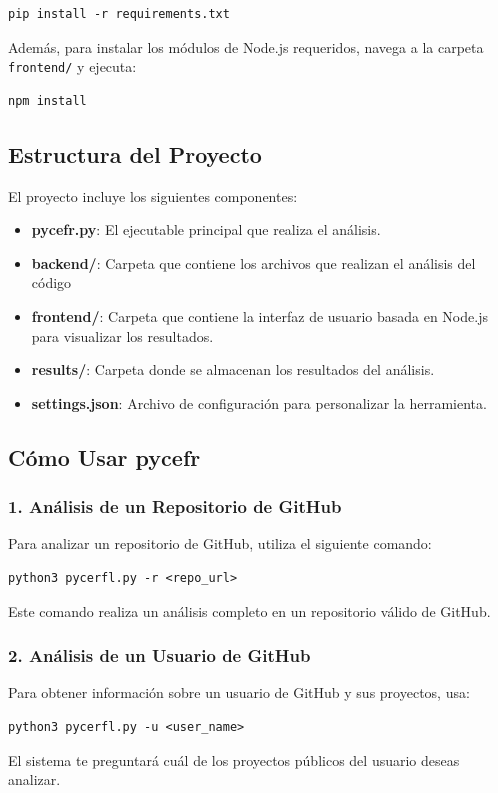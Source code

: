 \documentclass[a4paper, 12pt]{book}
\begin{document}
\begin{verbatim}
pip install -r requirements.txt
\end{verbatim}

Además, para instalar los módulos de Node.js requeridos, navega a la carpeta \texttt{frontend/} y ejecuta:

\begin{verbatim}
npm install
\end{verbatim}

\subsection{Estructura del Proyecto}
El proyecto incluye los siguientes componentes:

\begin{itemize}
    \item \textbf{pycefr.py}: El ejecutable principal que realiza el análisis.
    \item \textbf{backend/}: Carpeta que contiene los archivos que realizan el análisis del código
    \item \textbf{frontend/}: Carpeta que contiene la interfaz de usuario basada en Node.js para visualizar los resultados.
    \item \textbf{results/}: Carpeta donde se almacenan los resultados del análisis.
    \item \textbf{settings.json}: Archivo de configuración para personalizar la herramienta.
\end{itemize}

\subsection{Cómo Usar pycefr}

\subsubsection{1. Análisis de un Repositorio de GitHub}
Para analizar un repositorio de GitHub, utiliza el siguiente comando:
\begin{verbatim}
python3 pycerfl.py -r <repo_url>
\end{verbatim}
Este comando realiza un análisis completo en un repositorio válido de GitHub.

\subsubsection{2. Análisis de un Usuario de GitHub}
Para obtener información sobre un usuario de GitHub y sus proyectos, usa:
\begin{verbatim}
python3 pycerfl.py -u <user_name>
\end{verbatim}
El sistema te preguntará cuál de los proyectos públicos del usuario deseas analizar.
\end{document}
